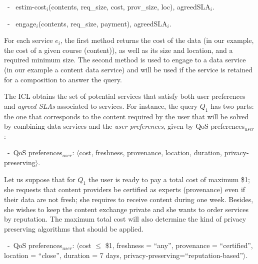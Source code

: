  
\begin{trivlist}\sf\footnotesize
\item[~-~]estim-cost$_i$(contents, req\_size, cost, prov\_size, loc), 
agreedSLA$_i$.

\item[~-~]engage$_i$(contents, req\_size, payment), agreedSLA$_i$.
\end{trivlist}

 

For each service $e_i$, the first method returns the cost of the data (in our example, the cost of a given course (content)), as well as its  size and location,  and a required minimum size.  
The second method is used to engage to a data service (in our example a content data service) and will be used  if the service is retained for a composition to answer the query.

 

The ICL  obtains the set of potential services that satisfy both user preferences and   \textit{agreed SLAs} associated to services. 
For instance, the query $Q_1$ has two parts: the one that corresponds to the content required by the user  that will be solved by combining data services and the \textit{user preferences}, given by {QoS preferences}$_\mathit{user}$:
\begin{trivlist}\sf\footnotesize
\item[~-~QoS preferences$_\mathit{user}$: ] $\langle$cost, freshness, provenance, location, duration, privacy-preserving$\rangle$. 
\end{trivlist}


Let us suppose that for $Q_1$  the user is ready to pay a total cost of maximum  \$1; she requests that content providers be certified as experts (provenance) even if their data are not fresh; she requires to receive content  during  one week. Besides, she wishes to keep the content exchange private and she wants to order services by reputation. The maximum total cost will  also determine the kind of privacy preserving algorithms that should be applied.
 
\begin{trivlist}\sf\footnotesize
\item[~-~QoS preferences$_\mathit{user}$: ] $\langle$cost $\leq$ \$1, freshness = ``any'', provenance = ``certified'', location = ``close'', duration = 7 days, privacy-preserving=``reputation-based''$\rangle$. 
\end{trivlist}



